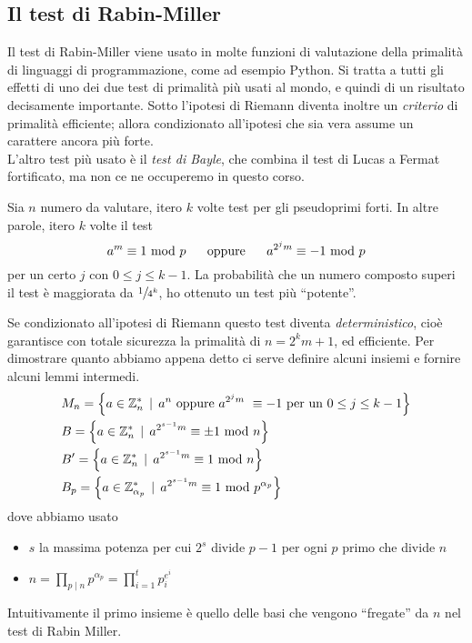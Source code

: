 \subsection{Il test di Rabin-Miller}
Il test di Rabin-Miller viene usato in molte funzioni di valutazione della primalità di linguaggi di programmazione, come ad esempio Python. Si tratta a tutti gli effetti di uno dei due test di primalità più usati al mondo, e quindi di un risultato decisamente importante. Sotto l'ipotesi di Riemann diventa inoltre un \emph{criterio} di primalità efficiente; allora condizionato all'ipotesi che sia vera assume un carattere ancora più forte. \\ L'altro test più usato è il \textit{test di Bayle}, che combina il test di Lucas a Fermat fortificato, ma non ce ne occuperemo in questo corso.
\begin{teorema}
	Sia $n$ numero da valutare, itero $k$ volte test per gli pseudoprimi forti. In altre parole, itero $k$ volte il test
	\begin{equation*}
	a^m\equiv1\Mod p \ \ \ \ \text{ oppure } \ \ \ \ a^{2^jm}\equiv-1\Mod p
	\end{equation*}
	per un certo $j$ con $0\leq j \leq k-1$.
	La probabilità che un numero composto superi il test è maggiorata da $\sfrac{1}{4^k}$, ho ottenuto un test più \enquote{potente}.
\end{teorema}
\begin{osservazione}
	Se condizionato all'ipotesi di Riemann questo test diventa \textit{deterministico}, cioè garantisce con totale sicurezza la primalità di $n=2^km+1$, ed efficiente. Per dimostrare quanto abbiamo appena detto ci serve definire alcuni insiemi e fornire alcuni lemmi intermedi. 
	\begin{align*}
	&M_n=\left\{a\in\mathbb{Z}_n^* \, \mid \, a^n \ \text{oppure} \ a^{2^jm} \ \equiv-1 \ \text{per un $0\leq j\leq k-1$}\right\}\\
	&B=\left\{a\in\mathbb{Z}_n^* \, \mid \, a^{2^{s-1}m}\equiv\pm1\Mod n\right\}\\
	&B'=\left\{a\in\mathbb{Z}_n^*\, \mid \,a^{2^{s-1}m}\equiv1\Mod n \right\}\\
	&B_p=\left\{a\in\mathbb{Z}_{\alpha_p}^*\, \mid \, a^{2^{s-1}m}\equiv1\Mod p^{\alpha_p}\right\}
	\end{align*}
	dove abbiamo usato
	\begin{itemize}
		\item $s$ la massima potenza per cui $2^s$ divide $p-1$ per ogni $p$ primo che divide $n$
		\item $n=\prod_{p\mid n}p^{\alpha_p}=\prod_{i=1}^tp_i^{e^i}$
	\end{itemize}
	Intuitivamente il primo insieme è quello delle basi che vengono \enquote{fregate} da $n$ nel test di Rabin Miller. 
\end{osservazione}
